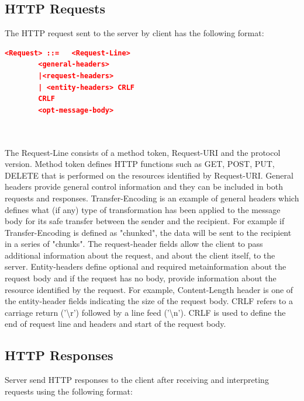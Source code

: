 \documentclass[a4paper,11pt,twoside]{article}
\begin{document}
\subsection{HTTP Requests} \label{Requests}
The HTTP request sent to the server by client has the following format:\\

\begin{lstlisting}[language=json,firstnumber=1]
<Request> ::=	<Request-Line>
		<general-headers>
		|<request-headers>
		| <entity-headers> CRLF
		CRLF 
		<opt-message-body>
		
\end{lstlisting} 
\noindent\\
The Request-Line consists of a method token, Request-URI and the protocol version. Method token defines HTTP functions such as GET, POST, PUT, DELETE that is performed on the resources identified by Request-URI. General headers provide general control information and they can be included in both requests and responses. Transfer-Encoding is an example of general headers which defines what (if any) type of transformation has been applied to the message body for its safe transfer between the sender and the recipient. For example if Transfer-Encoding is defined as "chunked", the data will be sent to the recipient in a series of "chunks". The request-header fields allow the client to pass additional information about the request, and about the client itself, to the server. Entity-headers define optional and required metainformation about the request body and if the request has no body, provide information about the resource identified by the request. For example, Content-Length header is one of the entity-header fields indicating the size of the request body. CRLF refers to a carriage return ('\textbackslash r') followed by a line feed ('\textbackslash n'). CRLF is used to define the end of request line and headers and start of the request body.


\subsection{HTTP Responses}
Server send HTTP responses to the client after receiving and interpreting requests using the following format: \\
\end{document}
